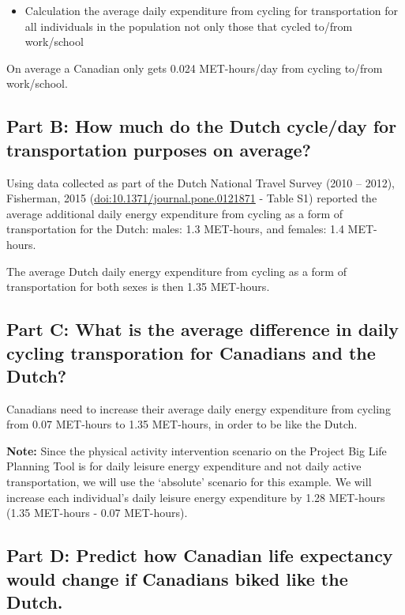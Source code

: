 \documentclass[]{book}
\providecommand{\tightlist}{%
  \setlength{\itemsep}{0pt}\setlength{\parskip}{0pt}}
\begin{document}
\begin{itemize}
\tightlist
\item
  Calculation the average daily expenditure from cycling for
  transportation for all individuals in the population not only those
  that cycled to/from work/school
\end{itemize}

On average a Canadian only gets 0.024 MET-hours/day from cycling to/from
work/school.

\subsection{Part B: How much do the Dutch cycle/day for transportation
purposes on
average?}\label{part-b-how-much-do-the-dutch-cycleday-for-transportation-purposes-on-average}

Using data collected as part of the Dutch National Travel Survey (2010
-- 2012), Fisherman, 2015 (\url{doi:10.1371/journal.pone.0121871} -
Table S1) reported the average additional daily energy expenditure from
cycling as a form of transportation for the Dutch: males: 1.3 MET-hours,
and females: 1.4 MET-hours.

The average Dutch daily energy expenditure from cycling as a form of
transportation for both sexes is then 1.35 MET-hours.

\subsection{Part C: What is the average difference in daily cycling
transporation for Canadians and the
Dutch?}\label{part-c-what-is-the-average-difference-in-daily-cycling-transporation-for-canadians-and-the-dutch}

Canadians need to increase their average daily energy expenditure from
cycling from 0.07 MET-hours to 1.35 MET-hours, in order to be like the
Dutch.

\textbf{Note:} Since the physical activity intervention scenario on the
Project Big Life Planning Tool is for daily leisure energy expenditure
and not daily active transportation, we will use the `absolute' scenario
for this example. We will increase each individual's daily leisure
energy expenditure by 1.28 MET-hours (1.35 MET-hours - 0.07 MET-hours).

\subsection{Part D: Predict how Canadian life expectancy would change if
Canadians biked like the
Dutch.}\label{part-d-predict-how-canadian-life-expectancy-would-change-if-canadians-biked-like-the-dutch.}
\end{document}
